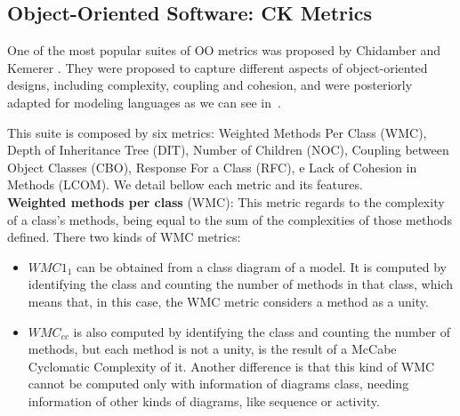 \subsection{Object-Oriented Software: \textrm{CK} Metrics}


One of the most popular suites of OO metrics was proposed by Chidamber and Kemerer \cite{Chidamber:1994:MSO:630808.631131}.
They were proposed to capture different aspects of object-oriented designs, including complexity, coupling and cohesion, and were posteriorly adapted for modeling languages as we can see in~\cite{Power2}.

This suite is composed by six metrics: Weighted Methods Per Class (WMC), Depth of Inheritance Tree (DIT), Number of Children (NOC), Coupling between Object Classes (CBO), Response For a Class (RFC), e Lack of Cohesion in Methods (LCOM).
We detail bellow each metric and its features.\\

\textbf{Weighted methods per class} (WMC): This metric regards to the complexity of a class's methods, being equal to the sum of the complexities of those methods defined. There two kinds of WMC metrics:
\begin{itemize}
\item \textbf{$WMC1_{1}$} can be obtained from a class diagram of a \umlS model. It is computed by identifying the class and counting the number of methods in that class, which means that, in this case, the WMC metric considers a method as a unity.
\item \textbf{$WMC_{cc}$} is also computed by identifying the class and counting the number of methods, but each method is not a unity, is the result of a McCabe Cyclomatic Complexity of it. Another difference is that this kind of WMC cannot be computed only with information of diagrams class, needing information of other kinds of diagrams, like sequence or activity.
\end{itemize}

